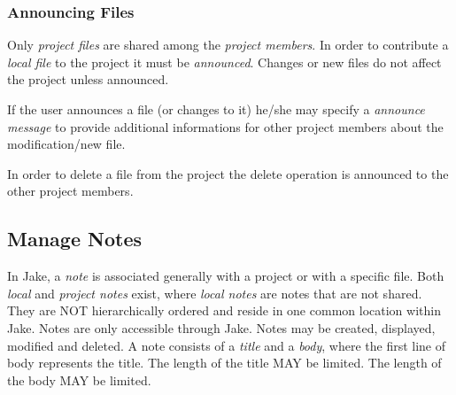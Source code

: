 \subsubsection{Announcing Files}
Only \emph{project files} are shared among the \emph{project members}. In order to contribute a \emph{local file} to the project it must be \emph{announced}. 
Changes or new files do not affect the project unless announced. 

If the user announces a file (or changes to it) he/she may specify a \emph{announce message} 
to provide additional informations for other project members about the modification/new file.

In order to delete a file from the project the delete operation is announced to the other project members.

\subsection{Manage Notes}
In Jake, a \emph{note} is associated generally with a project or with a specific file. Both \emph{local} and \emph{project notes} exist, where \emph{local notes} are notes that are not shared. They are NOT hierarchically ordered and reside in one common location within Jake. Notes are only accessible through Jake. Notes may be created, displayed, modified and deleted. 
A note consists of a \emph{title} and a \emph{body}, where the first line of body represents the title. The length of the title MAY be limited. The length of the body MAY be limited. 

